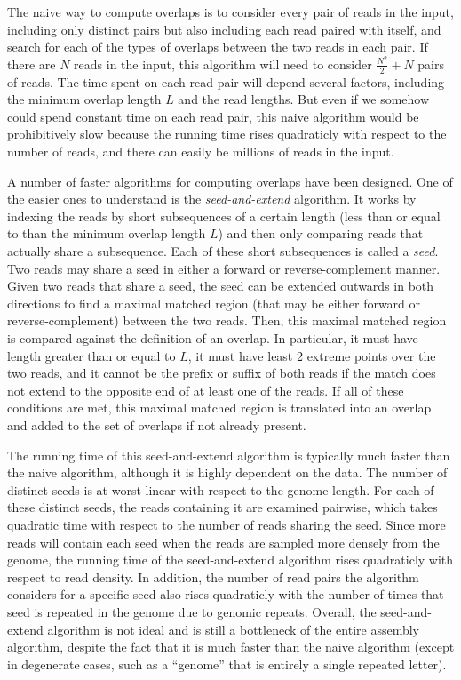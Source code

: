 \documentclass[12pt]{article}
\newcommand{\KeyTerm}[1]{{\it #1}}
\begin{document}
The naive way to compute overlaps is to consider every pair of reads in the
input, including only distinct pairs but also including each read paired with
itself, and search for each of the types of overlaps between the two reads in
each pair.  If there are $N$ reads in the input, this algorithm will need to
consider $\frac{N^2}{2} + N$ pairs of reads. The time spent on each read pair
will depend several factors, including the minimum overlap length $L$ and the
read lengths.  But even if we somehow could spend constant time on each read
pair, this naive algorithm would be prohibitively slow because the running time
rises quadraticly with respect to the number of reads, and there can easily be
millions of reads in the input.

A number of faster algorithms for computing overlaps have been designed.  One of
the easier ones to understand is the \KeyTerm{seed-and-extend} algorithm.  It
works by indexing the reads by short subsequences of a certain length (less than
or equal to than the minimum overlap length $L$) and then only comparing reads
that actually share a subsequence.  Each of these short subsequences is called a
\KeyTerm{seed}.  Two reads may share a seed in either a forward or
reverse-complement manner.  Given two reads that share a seed, the seed can be
extended outwards in both directions to find a maximal matched region (that may
be either forward or reverse-complement) between the two reads.  Then, this
maximal matched region is compared against the definition of an overlap.  In
particular, it must have length greater than or equal to $L$, it must have least
2 extreme points over the two reads, and it cannot be the prefix or suffix of
both reads if the match does not extend to the opposite end of at least one of
the reads.  If all of these conditions are met, this maximal matched region is
translated into an overlap and added to the set of overlaps if not already
present.

The running time of this seed-and-extend algorithm is
typically much faster than the naive algorithm, although it is highly dependent
on the data.  The number of distinct seeds is at worst linear with respect to
the genome length.
For each of these distinct seeds, the reads containing it are examined pairwise,
which takes quadratic time with respect to the number of reads sharing the
seed.  Since more reads will contain each seed when the reads are sampled more
densely from the genome, the running time of the seed-and-extend algorithm rises
quadraticly with respect to read density.  In addition, the number of read
pairs the algorithm considers for a specific seed also rises quadraticly with
the number of times that seed is repeated in the genome due to genomic repeats.
Overall, the seed-and-extend algorithm is not ideal and is still a bottleneck of
the entire assembly algorithm, despite the fact that it is much faster than the
naive algorithm (except in degenerate cases, such as a ``genome'' that is
entirely a single repeated letter).
\end{document}
